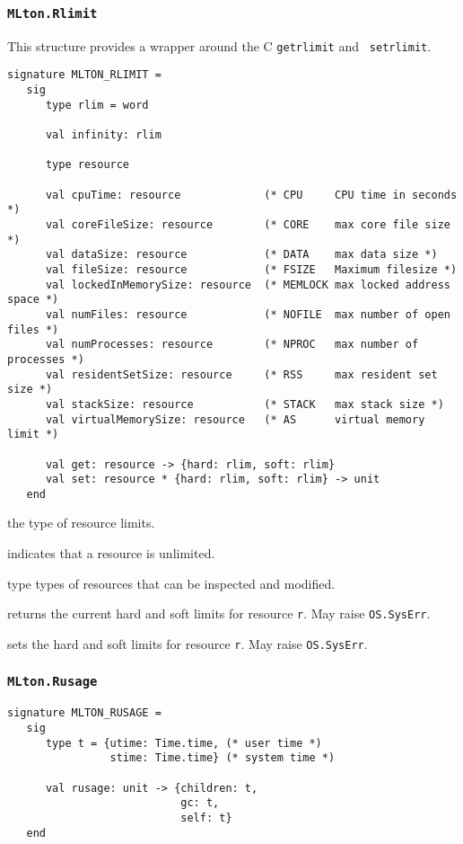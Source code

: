 \subsubsection{\tt MLton.Rlimit}
This structure provides a wrapper around the C {\tt getrlimit} and {\tt
setrlimit}.
\begin{verbatim}
signature MLTON_RLIMIT =
   sig
      type rlim = word
               
      val infinity: rlim

      type resource
               
      val cpuTime: resource             (* CPU     CPU time in seconds *)
      val coreFileSize: resource        (* CORE    max core file size *)
      val dataSize: resource            (* DATA    max data size *)
      val fileSize: resource            (* FSIZE   Maximum filesize *)
      val lockedInMemorySize: resource  (* MEMLOCK max locked address space *)
      val numFiles: resource            (* NOFILE  max number of open files *)  
      val numProcesses: resource        (* NPROC   max number of processes *)
      val residentSetSize: resource     (* RSS     max resident set size *)
      val stackSize: resource           (* STACK   max stack size *)
      val virtualMemorySize: resource   (* AS      virtual memory limit *)
      
      val get: resource -> {hard: rlim, soft: rlim}
      val set: resource * {hard: rlim, soft: rlim} -> unit
   end
\end{verbatim}

\begin{description}
the type of resource limits.

indicates that a resource is unlimited.

type types of resources that can be inspected and modified.

returns the current hard and soft limits for resource {\tt r}. May
raise {\tt OS.SysErr}.

sets the hard and soft limits for resource {\tt r}.  May raise {\tt OS.SysErr}.
\end{description}

\subsubsection{\tt MLton.Rusage}
\begin{verbatim}
signature MLTON_RUSAGE =
   sig
      type t = {utime: Time.time, (* user time *)
                stime: Time.time} (* system time *)
         
      val rusage: unit -> {children: t,
                           gc: t,
                           self: t}
   end
\end{verbatim}

